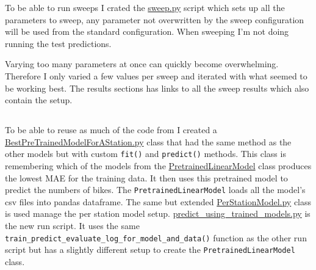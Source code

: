 \documentclass[a4paper]{article}
\begin{document}
    To be able to run sweeps I crated the \href{https://github.com/isabelladegen/mlp-2021/blob/fba40c1f27f066e1c5413c45a50c90a32a018f81/src/sweep.py}{sweep.py}
    script which sets up all the parameters to sweep, any parameter not overwritten by the
    sweep configuration will be used from the standard configuration. When sweeping I'm not doing running the test
    predictions.

    Varying too many parameters at once can quickly become overwhelming. Therefore I only varied a few values per sweep
    and iterated with what seemed to be working best. The results sections has links to all the sweep results which also contain the setup.


    \subsection*{}
    To be able to reuse as much of the code from  I created a
    \href{https://github.com/isabelladegen/mlp-2021/blob/fba40c1f27f066e1c5413c45a50c90a32a018f81/src/models/BestPreTrainedModelForAStation.py}{BestPreTrainedModelForAStation.py}
    class that had the same method as the other models but with custom \texttt{fit()} and \texttt{predict()} methods.
    This class is remembering which of the models from the \href{https://github.com/isabelladegen/mlp-2021/blob/fba40c1f27f066e1c5413c45a50c90a32a018f81/src/Data.py#L29}{PretrainedLinearModel}
    class produces the lowest MAE for the training data. It then uses this pretrained model to predict the numbers of bikes.
    The \texttt{PretrainedLinearModel} loads all the model's csv files into pandas dataframe. The same but extended
    \href{https://github.com/isabelladegen/mlp-2021/blob/fba40c1f27f066e1c5413c45a50c90a32a018f81/src/models/PerStationModel.py}{PerStationModel.py}
    class is used manage the per station model setup. \href{https://github.com/isabelladegen/mlp-2021/blob/fba40c1f27f066e1c5413c45a50c90a32a018f81/src/predict_using_trained_models.py}{predict\_using\_trained\_models.py}
    is the new run script. It uses the same \texttt{train\_predict\_evaluate\_log\_for\_model\_and\_data()} function
    as the other run script but has a slightly different setup to create the \texttt{PretrainedLinearModel} class.


    \subsection*{}
\end{document}
